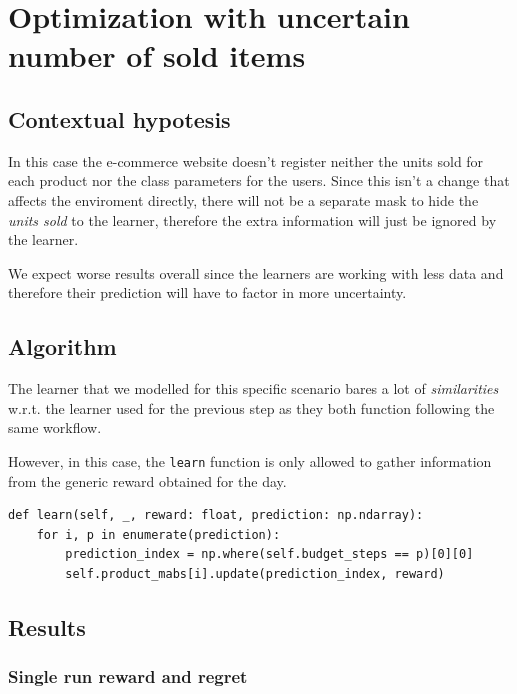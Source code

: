 \chapter{Optimization with uncertain number of sold items}
\label{chap:unc_items}

\section{Contextual hypotesis}
\label{sec:unc_it_hyp}

In this case the e-commerce website doesn't register neither the units sold for each product nor the class parameters for the users.
Since this isn't a change that affects the enviroment directly, there will not be a separate mask to hide the \textit{units sold} to the learner, therefore the extra information will just be ignored by the learner.

We expect worse results overall since the learners are working with less data and therefore their prediction will have to factor in more uncertainty.

\section{Algorithm}
\label{sec:unc_it_alg}

The learner that we modelled for this specific scenario bares a lot of \textit{similarities} w.r.t. the learner used for the previous step as they both function following the same workflow.

However, in this case, the \texttt{learn} function is only allowed to gather information from the generic reward obtained for the day.

\begin{lstlisting}[style=Python]
def learn(self, _, reward: float, prediction: np.ndarray):
	for i, p in enumerate(prediction):
		prediction_index = np.where(self.budget_steps == p)[0][0]
		self.product_mabs[i].update(prediction_index, reward)
\end{lstlisting}

\clearpage %

\section{Results}
\label{sec:unc_it_res}

\vspace*{2em} %

\subsection{Single run reward and regret}

